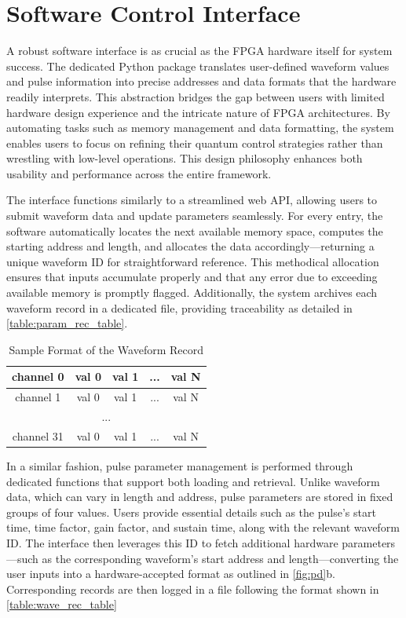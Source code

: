 \section{Software Control Interface}
A robust software interface is as crucial as the FPGA hardware itself for system success. The dedicated Python package translates user-defined waveform values and pulse information into precise addresses and data formats that the hardware readily interprets. This abstraction bridges the gap between users with limited hardware design experience and the intricate nature of FPGA architectures. By automating tasks such as memory management and data formatting, the system enables users to focus on refining their quantum control strategies rather than wrestling with low-level operations. This design philosophy enhances both usability and performance across the entire framework.

The interface functions similarly to a streamlined web API, allowing users to submit waveform data and update parameters seamlessly. For every entry, the software automatically locates the next available memory space, computes the starting address and length, and allocates the data accordingly—returning a unique waveform ID for straightforward reference. This methodical allocation ensures that inputs accumulate properly and that any error due to exceeding available memory is promptly flagged. Additionally, the system archives each waveform record in a dedicated file, providing traceability as detailed in \autoref{table:param_rec_table}.

\begin{table}[h]
\centering
\caption{Sample Format of the Waveform Record}
\label{table:param_rec_table}
\begin{tabular}{|c|c|c|c|c|}
\hline
channel 0 & val 0 & val 1 & ... & val N \\
\hline
channel 1 & val 0 & val 1 & ... & val N \\
\hline
\multicolumn{5}{|c|}{...} \\
\hline
channel 31 & val 0 & val 1 & ... & val N \\
\hline
\end{tabular}
\end{table}

In a similar fashion, pulse parameter management is performed through dedicated functions that support both loading and retrieval. Unlike waveform data, which can vary in length and address, pulse parameters are stored in fixed groups of four values. Users provide essential details such as the pulse's start time, time factor, gain factor, and sustain time, along with the relevant waveform ID. The interface then leverages this ID to fetch additional hardware parameters—such as the corresponding waveform's start address and length—converting the user inputs into a hardware-accepted format as outlined in \autoref{fig:pd}b. Corresponding records are then logged in a file following the format shown in \autoref{table:wave_rec_table}

